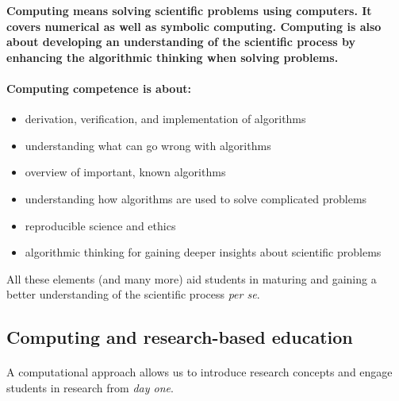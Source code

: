 \documentclass[%
oneside,                 %
final,                   %
10pt]{article}
\begin{document}
\textbf{Computing means solving scientific problems using computers. It covers numerical as well as symbolic computing. Computing is also about developing an understanding of the scientific process by enhancing the algorithmic thinking when solving problems.}




\paragraph{Computing competence is about:}

\begin{itemize}
\item derivation, verification, and implementation of algorithms

\item understanding what can go wrong with algorithms

\item overview of important, known algorithms

\item understanding how algorithms are used to solve complicated problems

\item reproducible science and ethics

\item algorithmic thinking for gaining deeper insights about scientific problems
\end{itemize}

\noindent
All these elements (and many more) aid students in maturing and gaining a better understanding of the scientific process \emph{per se}.







\subsection{Computing and research-based education}


\paragraph{}
A computational approach allows us to introduce research concepts and engage students in research from \emph{day one}.
\end{document}
